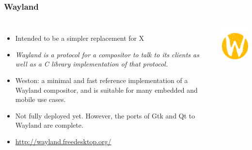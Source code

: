 \begin{frame}
  \frametitle{Wayland}
  \begin{columns}[T]
    \begin{itemize}
    \item Intended to be a simpler replacement for X
    \item {\em Wayland is a protocol for a compositor to talk to
    its clients as well as a C library implementation of that protocol.}
    \item Weston: a minimal and fast reference implementation
          of a Wayland compositor, and is suitable for many embedded
          and mobile use cases.
    \item Not fully deployed yet. However, the ports of Gtk and Qt
          to Wayland are complete.
    \item \url{http://wayland.freedesktop.org/}
    \end{itemize}
    \includegraphics[width=\textwidth]{slides/sysdev-embedded-linux/wayland.png}
  \end{columns}
\end{frame}

